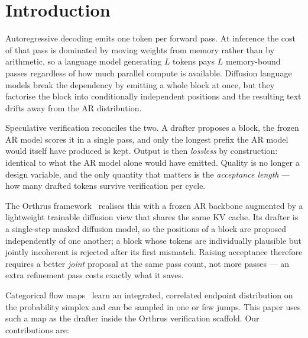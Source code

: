 \documentclass{zapiski}
\begin{document}
\section{Introduction}
\label{sec:intro}

Autoregressive decoding emits one token per forward pass. At inference the
cost of that pass is dominated by moving weights from memory rather than by
arithmetic, so a language model generating $L$ tokens pays $L$ memory-bound
passes regardless of how much parallel compute is available. Diffusion
language models break the dependency by emitting a whole block at once, but
they factorise the block into conditionally independent positions and the
resulting text drifts away from the AR distribution.

Speculative verification reconciles the two. A drafter proposes a block, the
frozen AR model scores it in a single pass, and only the longest prefix the AR
model would itself have produced is kept. Output is then \emph{lossless} by
construction: identical to what the AR model alone would have emitted. Quality
is no longer a design variable, and the only quantity that matters is the
\emph{acceptance length} --- how many drafted tokens survive verification per
cycle.

The Orthrus framework~\cite{nguyen2026orthrus} realises this with a frozen AR
backbone augmented by a lightweight trainable diffusion view that shares the
same KV cache. Its drafter is a single-step masked diffusion model, so the
positions of a block are proposed independently of one another; a block whose
tokens are individually plausible but jointly incoherent is rejected after its
first mismatch. Raising acceptance therefore requires a better \emph{joint}
proposal at the same pass count, not more passes --- an extra refinement pass
costs exactly what it saves.

Categorical flow maps~\cite{roos2026cfm} learn an integrated, correlated
endpoint distribution on the probability simplex and can be sampled in one or
few jumps. This paper uses such a map as the drafter inside the Orthrus
verification scaffold. Our contributions are:
\end{document}
